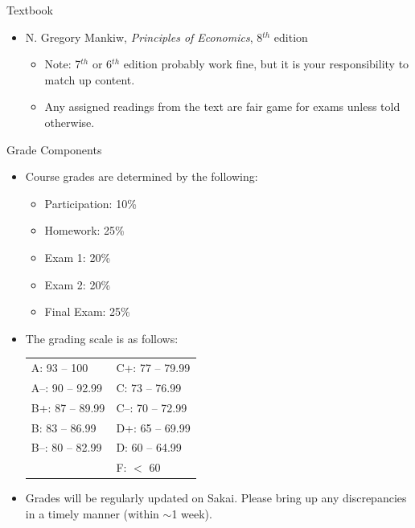 \documentclass[xcolor={dvipsnames},pdf, hyperref={colorlinks=true, citecolor=ForestGreen, linkcolor=BlueViolet, urlcolor=Magenta}]{beamer}
\begin{document}
	\begin{frame}{Textbook}
		\begin{itemize}
			\item N. Gregory Mankiw, \textit{Principles of Economics}, 8$^{th}$ edition
			\begin{itemize}
				\item Note: 7$^{th}$ or 6$^{th}$ edition probably work fine, but it is your responsibility to match up content.
				\item Any assigned readings from the text are fair game for exams unless told otherwise.
			\end{itemize}
	\end{itemize}
	\end{frame}


	\begin{frame}{Grade Components}
	\begin{itemize}
		\item Course grades are determined by the following:
		\begin{itemize}
			\item Participation: 10\%
			\item Homework: 25\%
			\item Exam 1: 	20\%
			\item Exam 2: 20\%
			\item	Final Exam: 25\% 
		\end{itemize}
		\item The grading scale is as follows:
		
		\begin{center}
			\begin{tabular}{ p{3.5cm} p{3.5cm} }
				A: 93 -- 100 &  C+: 77 -- 79.99\\
				A--: 90 -- 92.99 & C: 73 -- 76.99\\
				B+: 87 -- 89.99 & C--: 70 -- 72.99\\
				B: 83 -- 86.99 & D+: 65 -- 69.99\\
				B--: 80 -- 82.99 & D: 60 -- 64.99\\
				& F: $<$ 60
			\end{tabular}
		\end{center}
		
		\item Grades will be regularly updated on Sakai. Please bring up any discrepancies in a timely manner (within $\sim$1 week). 
	\end{itemize}
		

	\end{frame}
	
\end{document}
